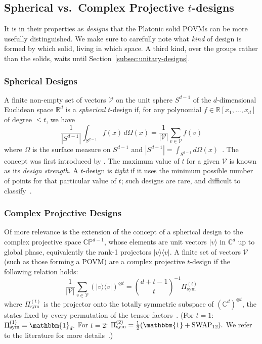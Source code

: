 \documentclass[11pt, oneside, openany]{scrbook}
\newcommand{\C}{\mathbb{C}}
\newcommand{\Id}{\mathbbm{1}}
\newcommand{\ket}[1]{|#1\rangle}
\newcommand{\ketbra}[2]{|#1\rangle\langle#2|}
\begin{document}
\subsection{Spherical vs.\ Complex Projective \texorpdfstring{$t$}{t}-designs} \label{subsec:tdesigns}

It is in their properties as \textit{designs} that the Platonic solid POVMs can be more usefully distinguished. We make sure to carefully note what \textit{kind} of design is formed by which solid, living in which space. A third kind, over the groups rather than the solids, waits until Section~\ref{subsec:unitary-designs}.

\subsubsection{Spherical Designs}

A finite non-empty set of vectors $\mathcal{V}$ on the unit sphere $S^{d-1}$ of the $d$-dimensional Euclidean space $\mathbb{R}^d$ is a \textit{spherical} $t$-design if, for any polynomial $f \in \mathbb{R}[x_1, \dots, x_d]$ of degree $\leq t$, we have
$$ \frac{1}{|S^{d-1}|} \int_{S^{d-1}} f(x) \, d\Omega(x) = \frac{1}{|\mathcal{V}|} \sum_{v \in \mathcal{V}} f(v) $$
where $\Omega$ is the surface measure on $S^{d-1}$ and $|S^{d-1}| = \int_{S^{d-1}} d\Omega(x)$~\cite{hirao2025sphericaldesignsfinite}. The concept was first introduced by \textcite{delsarte1977sphericalcodesdesigns}. The maximum value of $t$ for a given $\mathcal{V}$ is known as its \textit{design strength}. A $t$-design is \textit{tight} if it uses the minimum possible number of points for that particular value of $t$; such designs are rare, and difficult to classify~\cite{nasmith2023tight}.

\subsubsection{Complex Projective Designs}

Of more relevance is the extension of the concept of a spherical design to the complex projective space $\mathbb{CP}^{d-1}$, whose elements are unit vectors $\ket{v}$ in $\C^d$ up to global phase, equivalently the rank-1 projectors $\ketbra{v}{v}$. A finite set of vectors $\mathcal{V}$ (such as those forming a POVM) are a complex projective $t$-design if the following relation holds:
$$ \frac{1}{|\mathcal{V}|} \sum_{v \in \mathcal{V}} (\ketbra{v}{v})^{\otimes t} = \binom{d+t-1}{t}^{-1} \Pi_{\mathrm{sym}}^{(t)} $$
where $\Pi_{\mathrm{sym}}^{(t)}$ is the projector onto the totally symmetric subspace of $(\C^d)^{\otimes t}$, the states fixed by every permutation of the tensor factors~\cite{scott2006tightinformationallycomplete, roy2007weightedcomplexprojective, harrow2013churchsymmetricsubspace}. (For $t=1$: $\Pi_{\mathrm{sym}}^{(1)} = \Id_d.$ For $t=2$: $\Pi_{\mathrm{sym}}^{(2)} = \frac{1}{2}(\Id + \operatorname{SWAP}_{12}).$ We refer to the literature for more details~\cite[Ch.~7]{watrous2018theoryquantuminformation}.)
\end{document}
